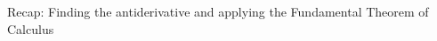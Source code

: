 \documentclass[preview]{standalone}
\begin{document}
\begin{center}
Recap: Finding the antiderivative and applying the Fundamental Theorem of Calculus
\end{center}
\end{document}

